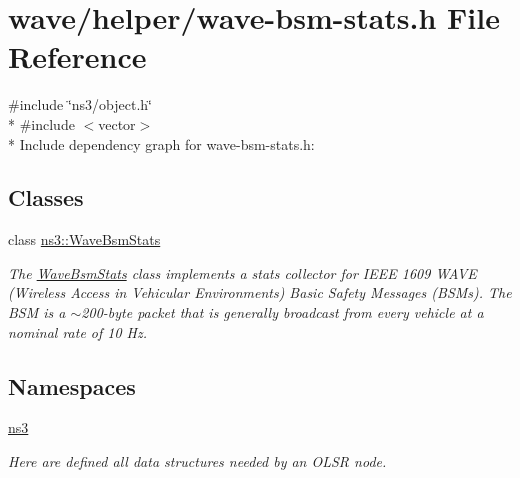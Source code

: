 \hypertarget{wave-bsm-stats_8h}{}\section{wave/helper/wave-\/bsm-\/stats.h File Reference}
\label{wave-bsm-stats_8h}
{\ttfamily \#include \char`\"{}ns3/object.\+h\char`\"{}}\\*
{\ttfamily \#include $<$vector$>$}\\*
Include dependency graph for wave-\/bsm-\/stats.h\+:
\subsection*{Classes}
\begin{DoxyCompactItemize}
\item 
class \hyperlink{classns3_1_1WaveBsmStats}{ns3\+::\+Wave\+Bsm\+Stats}
\begin{DoxyCompactList}\small\item\em The \hyperlink{classns3_1_1WaveBsmStats}{Wave\+Bsm\+Stats} class implements a stats collector for I\+E\+EE 1609 W\+A\+VE (Wireless Access in Vehicular Environments) Basic Safety Messages (B\+S\+Ms). The B\+SM is a $\sim$200-\/byte packet that is generally broadcast from every vehicle at a nominal rate of 10 Hz. \end{DoxyCompactList}\end{DoxyCompactItemize}
\subsection*{Namespaces}
\begin{DoxyCompactItemize}
\item 
 \hyperlink{namespacens3}{ns3}
\begin{DoxyCompactList}\small\item\em Here are defined all data structures needed by an O\+L\+SR node. \end{DoxyCompactList}\end{DoxyCompactItemize}
